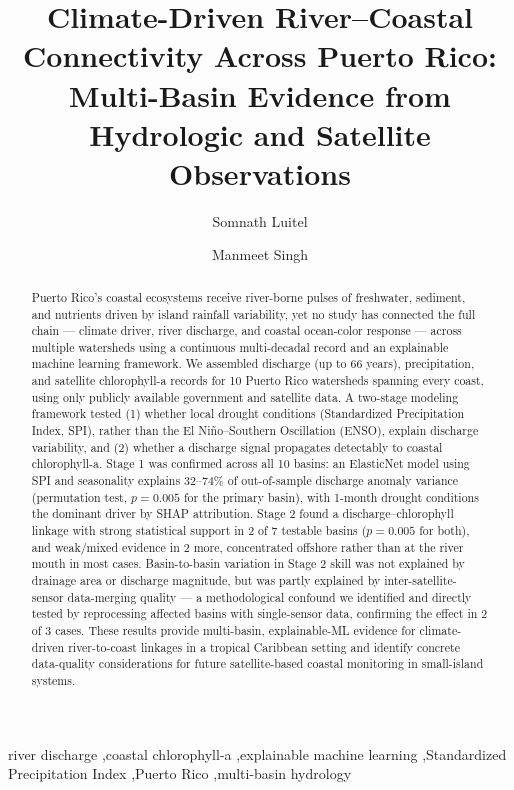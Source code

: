 \documentclass[preprint,12pt]{elsarticle}
\begin{document}
\begin{frontmatter}

\title{Climate-Driven River--Coastal Connectivity Across Puerto Rico: Multi-Basin Evidence from Hydrologic and Satellite Observations}

\author[wku]{Somnath Luitel}
\author[wku]{Manmeet Singh}


\begin{abstract}
Puerto Rico's coastal ecosystems receive river-borne pulses of freshwater, sediment, and nutrients driven by island rainfall variability, yet no study has connected the full chain --- climate driver, river discharge, and coastal ocean-color response --- across multiple watersheds using a continuous multi-decadal record and an explainable machine learning framework. We assembled discharge (up to 66 years), precipitation, and satellite chlorophyll-a records for 10 Puerto Rico watersheds spanning every coast, using only publicly available government and satellite data. A two-stage modeling framework tested (1) whether local drought conditions (Standardized Precipitation Index, SPI), rather than the El Ni\~no--Southern Oscillation (ENSO), explain discharge variability, and (2) whether a discharge signal propagates detectably to coastal chlorophyll-a. Stage 1 was confirmed across all 10 basins: an ElasticNet model using SPI and seasonality explains 32--74\% of out-of-sample discharge anomaly variance (permutation test, $p=0.005$ for the primary basin), with 1-month drought conditions the dominant driver by SHAP attribution. Stage 2 found a discharge--chlorophyll linkage with strong statistical support in 2 of 7 testable basins ($p=0.005$ for both), and weak/mixed evidence in 2 more, concentrated offshore rather than at the river mouth in most cases. Basin-to-basin variation in Stage 2 skill was not explained by drainage area or discharge magnitude, but was partly explained by inter-satellite-sensor data-merging quality --- a methodological confound we identified and directly tested by reprocessing affected basins with single-sensor data, confirming the effect in 2 of 3 cases. These results provide multi-basin, explainable-ML evidence for climate-driven river-to-coast linkages in a tropical Caribbean setting and identify concrete data-quality considerations for future satellite-based coastal monitoring in small-island systems.
\end{abstract}

\begin{keyword}
river discharge \sep coastal chlorophyll-a \sep explainable machine learning \sep Standardized Precipitation Index \sep Puerto Rico \sep multi-basin hydrology
\end{keyword}

\end{frontmatter}
\end{document}
